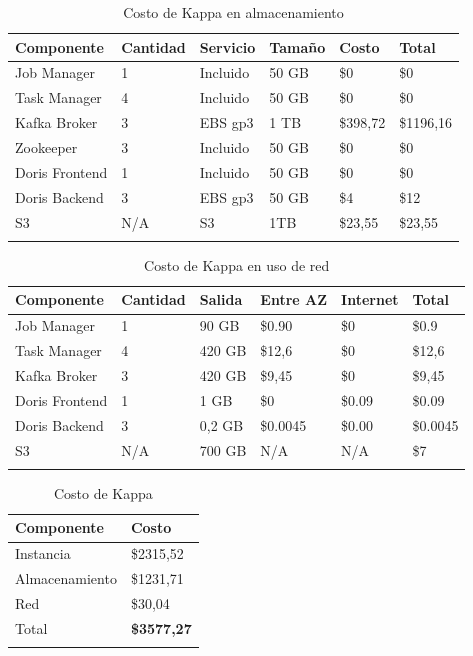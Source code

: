 \begin{longtable}{|p{3cm}|p{2cm}|p{2cm}|p{2cm}|p{2cm}|p{2cm}|}
    \hline
    \textbf{Componente} & \textbf{Cantidad} & \textbf{Servicio} & \textbf{Tamaño} & \textbf{Costo} & \textbf{Total} \\
    \hline
    Job Manager & 1 & Incluido & 50 GB & \$0 & \$0 \\
    \hline
    Task Manager & 4 & Incluido & 50 GB & \$0 & \$0 \\
    \hline
    Kafka Broker & 3 & EBS gp3 & 1 TB & \$398,72 & \$1196,16 \\
    \hline
    Zookeeper & 3 & Incluido & 50 GB & \$0 & \$0 \\
    \hline
    Doris Frontend & 1 & Incluido & 50 GB & \$0 & \$0 \\
    \hline
    Doris Backend & 3 &  EBS gp3 & 50 GB & \$4 & \$12 \\
    \hline
    S3 & N/A & S3 & 1TB & \$23,55 & \$23,55 \\
    \hline
    \caption{Costo de Kappa en almacenamiento} \\
\end{longtable}

\begin{longtable}{|p{3cm}|p{2cm}|p{2cm}|p{2cm}|p{2cm}|p{2cm}|}
    \hline
    \textbf{Componente} & \textbf{Cantidad} & \textbf{Salida} & \textbf{Entre AZ} & \textbf{Internet} & \textbf{Total} \\
    \hline
    Job Manager & 1 & 90 GB    & \$0.90 & \$0 & \$0.9 \\
    \hline
    Task Manager & 4 & 420 GB  & \$12,6 & \$0 & \$12,6 \\
    \hline
    Kafka Broker & 3 & 420 GB  & \$9,45 & \$0 & \$9,45 \\
    \hline
    Doris Frontend & 1 & 1 GB  & \$0 & \$0.09 & \$0.09 \\
    \hline
    Doris Backend & 3 & 0,2 GB & \$0.0045 & \$0.00 & \$0.0045 \\
    \hline
    S3 & N/A & 700 GB & N/A & N/A & \$7 \\
    \hline
    \caption{Costo de Kappa en uso de red} \\
\end{longtable}

\begin{longtable}{|p{3cm}|>{\raggedleft\arraybackslash}p{11cm}|}
    \hline
    \textbf{Componente} & \textbf{Costo} \\
    \hline
    Instancia & \$2315,52 \\
    \hline
    Almacenamiento & \$1231,71 \\
    \hline
    Red & \$30,04 \\
    \hline
    Total & \textbf{\$3577,27} \\
    \hline
    \caption{Costo de Kappa} \\
\end{longtable}

